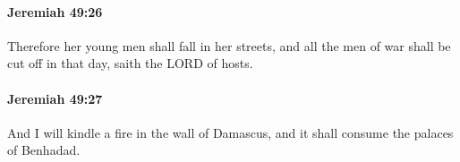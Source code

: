 		\paragraph{Jeremiah 49:26} %
			\label{JEREMIAH-49-26}

			Therefore her young men shall fall in her streets, and all the men of war shall be cut off in that day, saith the LORD of hosts.


		\paragraph{Jeremiah 49:27} %
			\label{JEREMIAH-49-27}

			And I will kindle a fire in the wall of Damascus, and it shall consume the palaces of Benhadad.


